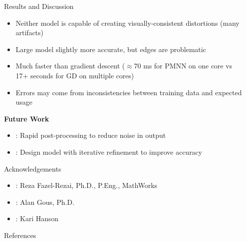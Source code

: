 \documentclass[final,16pt]{beamer}
\newlength{\sepwidth}
\newlength{\colwidth}
\newcommand{\separatorcolumn}{\begin{column}{\sepwidth}\end{column}}
\begin{document}
\begin{frame}[t]
\begin{columns}[t]
\begin{column}{\colwidth}
      \begin{block}{Results and Discussion}
        \begin{itemize}
          \item Neither model is capable of creating visually-consistent distortions (many artifacts)
          \item Large model slightly more accurate, but edges are problematic
          \item Much faster than gradient descent ($\approx$70 ms for PMNN on one core vs 17+ seconds for GD on multiple cores)
          \item Errors may come from inconsistencies between training data and expected usage
        \end{itemize}

        \textbf{Future Work}
        \begin{itemize}
          \item {}: Rapid post-processing to reduce noise in output
          \item {}: Design model with iterative refinement to improve accuracy \cite{andrychowicz_learning_2016}
        \end{itemize}

      \end{block}

      \begin{block}{Acknowledgements}
        \begin{itemize}
          \item {}: Reza Fazel-Rezai, Ph.D., P.Eng., MathWorks
          \item {}: Alan Gous, Ph.D.
          \item {}: Kari Hanson
        \end{itemize}
      \end{block}

      \begin{block}{References}

        \nocite{*}
        \footnotesize{}

      \end{block}

    \end{column}

    \separatorcolumn
  \end{columns}
\end{frame}
\end{document}
